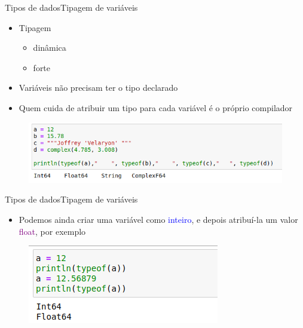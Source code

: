 \documentclass{beamer}
\begin{document}
\begin{frame}{Tipos de dados}{Tipagem de variáveis}
    \begin{itemize}
        \item Tipagem \begin{itemize}
            \item dinâmica
            \item forte
        \end{itemize}
        \item Variáveis não precisam ter o tipo declarado
        \item Quem cuida de atribuir um tipo para cada variável é o próprio compilador
    \end{itemize}
    \begin{figure}
        \centering
        \includegraphics[scale=0.4]{imagens/tipos-variaveis.png}
        \label{fig:ex-tipos}
    \end{figure}
\end{frame}

\begin{frame}{Tipos de dados}{Tipagem de variáveis}
    \begin{itemize}
        \item Podemos ainda criar uma variável como \textcolor{blue}{inteiro}, e depois atribuí-la um valor \textcolor{purple}{float}, por exemplo
    \end{itemize}
    \begin{figure}
        \centering
        \includegraphics[scale=0.5]{imagens/tipagem02.png}
        \label{fig:ex-tipagem2}
    \end{figure}
\end{frame}
\end{document}
